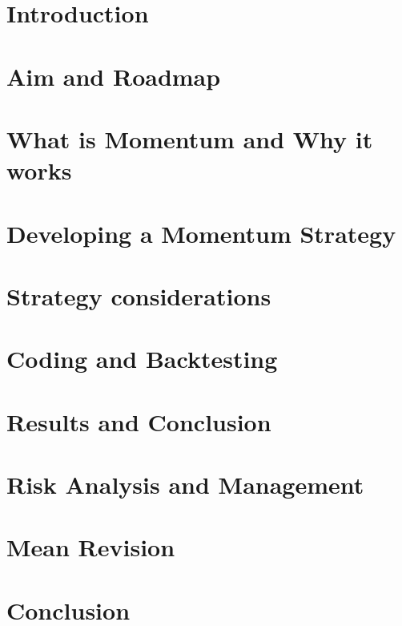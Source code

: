\documentclass[a4paper]{article}
\begin{document}
\tableofcontents

\newpage

\setcounter{page}{1}

\section{Introduction}

\newpage

\section{Aim and Roadmap}

\newpage

\section{What is Momentum and Why it works}

\newpage

\section{Developing a Momentum Strategy}

\newpage

\section{Strategy considerations}

\newpage

\section{Coding and Backtesting}

\newpage

\section{Results and Conclusion}

\newpage

\section{Risk Analysis and Management}

\newpage

\section{Mean Revision}

\newpage

\section{Conclusion}

\newpage
\end{document}
